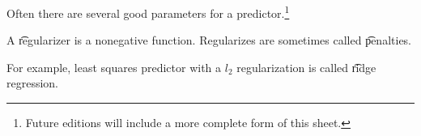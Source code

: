 

Often there are several good parameters for a predictor.\footnote{Future editions will include a more complete form of this sheet.}


A \t{regularizer} is a nonegative function.
Regularizes are sometimes called \t{penalties}.

For example, least squares predictor with a $l_2$ regularization is called \t{ridge regression}.

\blankpage
